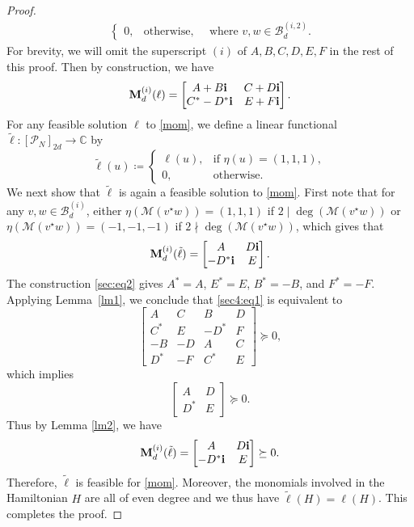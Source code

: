 \documentclass[10pt,a4paper]{amsart}
\def\C{{\mathbb{C}}}
\def\MM{{\mathbf{M}}}
\def\bi{\hbox{\bf{i}}}
\def\cB{{\mathcal{B}}}
\def\sM{{\mathscr{M}}}
\def\sP{{\mathscr{P}}}
\theoremstyle{plain}
\theoremstyle{definition}
\theoremstyle{remark}
\begin{document}
\begin{proof}
\begin{subequations}
\begin{align}
\begin{cases}
    0, &\text{otherwise},
    \end{cases}\quad \text{where } v,w\in\cB_d^{(i,2)}.
    \end{align}
\end{subequations}
For brevity, we will omit the superscript $(i)$ of $A,B,C,D,E,F$ in the rest of this proof.
Then by construction, we have
\begin{equation}\label{sec4:eq1}
    \MM_{d}^{(i)}(\ell)=\begin{bmatrix}
        A+B\bi&C+D\bi\\
        C^{*}-D^{*}\bi&E+F\bi
    \end{bmatrix}.
\end{equation}
For any feasible solution $\ell$ to \eqref{mom}, we define a linear functional $\tilde{\ell}:[\sP_N]_{2d}\rightarrow\C$ by
\begin{equation}
    \tilde{\ell}(u)\coloneqq\begin{cases}\ell(u),&\text{if }\eta(u)=(1,1,1),\\
    0, &\text{otherwise}.\end{cases}
\end{equation}
We next show that $\tilde{\ell}$ is again a feasible solution to \eqref{mom}.
First note that for any $v,w\in\cB_d^{(i)}$, either $\eta(\sM(v^{\star}w))=(1,1,1)$ if $2\mid\deg(\sM(v^{\star}w))$ or $\eta(\sM(v^{\star}w))=(-1,-1,-1)$ if $2\nmid\deg(\sM(v^{\star}w))$, which gives that
\begin{equation}
\MM_{d}^{(i)}(\tilde{\ell})=\begin{bmatrix}
A&D\bi\\
-D^{*}\bi&E
\end{bmatrix}.
\end{equation}
The construction \eqref{sec:eq2} gives $A^*=A$, $E^*=E$, $B^*=-B$, and $F^*=-F$. Applying Lemma~\ref{lm1}, we conclude that \eqref{sec4:eq1} is equivalent to
\begin{equation}
\begin{bmatrix}
A&C&B&D\\
C^*&E&-D^*&F\\
-B&-D&A&C\\
D^*&-F&C^*&E
\end{bmatrix}\succeq0,
\end{equation}
which implies
\begin{equation}
\begin{bmatrix}
A&D\\
D^{*}&E
\end{bmatrix}\succeq0.
\end{equation}
Thus by Lemma \ref{lm2}, we have
\begin{equation}
\MM_{d}^{(i)}(\tilde{\ell})=\begin{bmatrix}
A&D\bi\\
-D^{*}\bi&E
\end{bmatrix}\succeq0.
\end{equation}
Therefore, $\tilde{\ell}$ is feasible for \eqref{mom}.
Moreover, the monomials involved in the Hamiltonian $H$ are all of even degree and we thus have $\tilde{\ell}(H)=\ell(H)$.
This completes the proof.
\end{proof}
\end{document}
